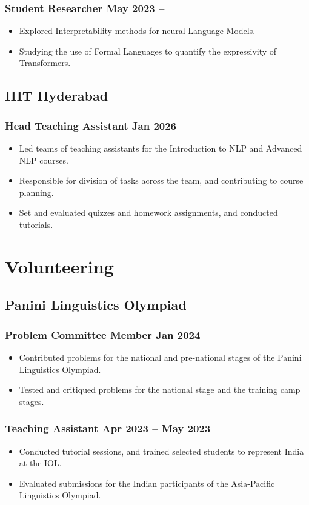 \documentclass[11pt]{article}
\newcommand{\rside}[1]{
  \hfill {\normalfont\color{accent} #1}%
}
\begin{document}
\subsubsection{Student Researcher \rside{May 2023 --}}
\begin{itemize}
  \item Explored Interpretability methods for neural Language Models.
  \item Studying the use of Formal Languages to quantify the expressivity of Transformers.
\end{itemize}

\subsection{IIIT Hyderabad}
\subsubsection{Head Teaching Assistant \rside{Jan 2026 --}}
\begin{itemize}
  \item Led teams of teaching assistants for the Introduction to NLP and Advanced NLP courses.
  \item Responsible for division of tasks across the team, and contributing to course planning.
  \item Set and evaluated quizzes and homework assignments, and conducted tutorials.
\end{itemize}


\section{Volunteering}
\subsection{Panini Linguistics Olympiad}
\subsubsection{Problem Committee Member \rside{Jan 2024 --}}
\begin{itemize}
\item Contributed problems for the national and pre-national stages of the Panini Linguistics Olympiad.
\item Tested and critiqued problems for the national stage and the training camp stages.
\end{itemize}
\subsubsection{Teaching Assistant \rside{Apr 2023 -- May 2023}}
\begin{itemize}
\item Conducted tutorial sessions, and trained selected students to represent India at the IOL.
\item Evaluated submissions for the Indian participants of the Asia-Pacific Linguistics Olympiad.
\end{itemize}
\end{document}
